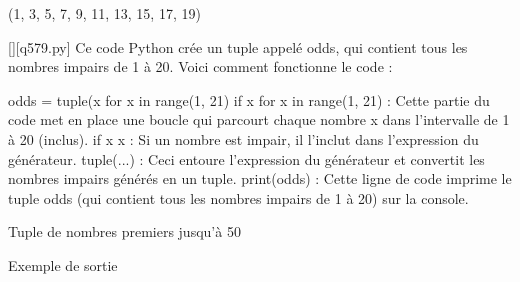 (1, 3, 5, 7, 9, 11, 13, 15, 17, 19)
        \par
        \begin{solution}
            \renewcommand{\nomfichier}{q579.py}
            \pythonfile{\chemincode \nomfichier}[][\nomfichier]
            Ce code Python crée un tuple appelé odds, qui contient tous les nombres impairs de 1 à 20. Voici comment fonctionne le code :

    odds = tuple(x for x in range(1, 21) if x %
        for x in range(1, 21) : Cette partie du code met en place une boucle qui parcourt chaque nombre x dans l'intervalle de 1 à 20 (inclus).
        if x %
        x : Si un nombre est impair, il l'inclut dans l'expression du générateur.
        tuple(...) : Ceci entoure l'expression du générateur et convertit les nombres impairs générés en un tuple.
    print(odds) : Cette ligne de code imprime le tuple odds (qui contient tous les nombres impairs de 1 à 20) sur la console.
        \end{solution}
        

        \question
        Tuple de nombres premiers jusqu'à 50

Exemple de sortie


